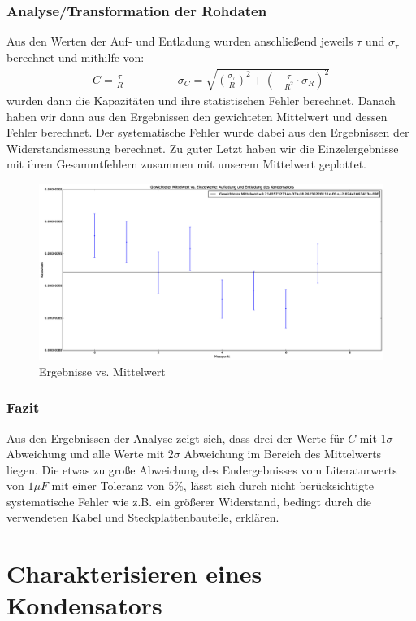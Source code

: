 \documentclass[12pt,a4paper]{article}
\begin{document}
\subsubsection{Analyse/Transformation der Rohdaten}
Aus den Werten der Auf- und Entladung wurden anschließend jeweils $\tau$ und $\sigma_{\tau}$ berechnet und mithilfe von:
\begin{align*}
C=\frac{\tau}{R} \hspace{2cm} \sigma_C=\sqrt{(\frac{\sigma_{\tau}}{R})^2+(-\frac{\tau}{R^2}\cdot \sigma_R)^2}
\end{align*}
wurden dann die Kapazitäten und ihre statistischen Fehler berechnet.
Danach haben wir dann aus den Ergebnissen den gewichteten Mittelwert und dessen Fehler berechnet. Der systematische Fehler wurde dabei aus den Ergebnissen der Widerstandsmessung berechnet.
Zu guter Letzt haben wir die Einzelergebnisse mit ihren Gesammtfehlern zusammen mit unserem Mittelwert geplottet.
\begin{figure}[hbtp]
\centering
\includegraphics[scale=0.3]{auf-entladung.eps}
\caption{Ergebnisse vs. Mittelwert}
\end{figure}
\subsubsection{Fazit}
Aus den Ergebnissen der Analyse zeigt sich, dass drei der Werte für $C$ mit $1\sigma$ Abweichung und alle Werte mit $2\sigma$ Abweichung im Bereich des Mittelwerts liegen. Die etwas zu große Abweichung des Endergebnisses vom Literaturwerts von $1\mu F$ mit einer Toleranz von $5 \%$, lässt sich durch nicht berücksichtigte systematische Fehler wie z.B. ein größerer Widerstand, bedingt durch die verwendeten Kabel und Steckplattenbauteile, erklären.
\section{Charakterisieren eines Kondensators}
\end{document}
